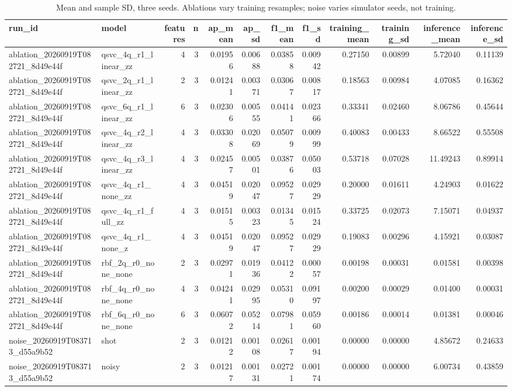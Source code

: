 \begin{table}
\caption{Mean and sample SD, three seeds. Ablations vary training resamples; noise varies simulator seeds, not training.}
\begin{tabular}{llrrrrrrrrrr}
\toprule
run\_id & model & features & n & ap\_mean & ap\_sd & f1\_mean & f1\_sd & training\_mean & training\_sd & inference\_mean & inference\_sd \\
\midrule
ablation\_20260919T082721\_8d49e44f & qsvc\_4q\_r1\_linear\_zz & 4 & 3 & 0.01956 & 0.00688 & 0.03858 & 0.00942 & 0.27150 & 0.00899 & 5.72040 & 0.11139 \\
ablation\_20260919T082721\_8d49e44f & qsvc\_2q\_r1\_linear\_zz & 2 & 3 & 0.01241 & 0.00371 & 0.03067 & 0.00817 & 0.18563 & 0.00984 & 4.07085 & 0.16362 \\
ablation\_20260919T082721\_8d49e44f & qsvc\_6q\_r1\_linear\_zz & 6 & 3 & 0.02306 & 0.00555 & 0.04141 & 0.02366 & 0.33341 & 0.02460 & 8.06786 & 0.45644 \\
ablation\_20260919T082721\_8d49e44f & qsvc\_4q\_r2\_linear\_zz & 4 & 3 & 0.03308 & 0.02069 & 0.05079 & 0.00999 & 0.40083 & 0.00433 & 8.66522 & 0.55508 \\
ablation\_20260919T082721\_8d49e44f & qsvc\_4q\_r3\_linear\_zz & 4 & 3 & 0.02457 & 0.00501 & 0.03876 & 0.05003 & 0.53718 & 0.07028 & 11.49243 & 0.89914 \\
ablation\_20260919T082721\_8d49e44f & qsvc\_4q\_r1\_none\_zz & 4 & 3 & 0.04519 & 0.02047 & 0.09527 & 0.02929 & 0.20000 & 0.01611 & 4.24903 & 0.01622 \\
ablation\_20260919T082721\_8d49e44f & qsvc\_4q\_r1\_full\_zz & 4 & 3 & 0.01515 & 0.00323 & 0.01345 & 0.01524 & 0.33725 & 0.02073 & 7.15071 & 0.04937 \\
ablation\_20260919T082721\_8d49e44f & qsvc\_4q\_r1\_none\_z & 4 & 3 & 0.04519 & 0.02047 & 0.09527 & 0.02929 & 0.19083 & 0.00296 & 4.15921 & 0.03087 \\
ablation\_20260919T082721\_8d49e44f & rbf\_2q\_r0\_none\_none & 2 & 3 & 0.02971 & 0.01936 & 0.04122 & 0.00057 & 0.00198 & 0.00031 & 0.01581 & 0.00398 \\
ablation\_20260919T082721\_8d49e44f & rbf\_4q\_r0\_none\_none & 4 & 3 & 0.04241 & 0.02995 & 0.05310 & 0.09197 & 0.00200 & 0.00029 & 0.01400 & 0.00031 \\
ablation\_20260919T082721\_8d49e44f & rbf\_6q\_r0\_none\_none & 6 & 3 & 0.06072 & 0.05214 & 0.07981 & 0.05960 & 0.00186 & 0.00014 & 0.01381 & 0.00046 \\
noise\_20260919T083713\_d55a9b52 & shot & 2 & 3 & 0.01212 & 0.00108 & 0.02617 & 0.00194 & 0.00000 & 0.00000 & 4.85672 & 0.24633 \\
noise\_20260919T083713\_d55a9b52 & noisy & 2 & 3 & 0.01217 & 0.00131 & 0.02721 & 0.00174 & 0.00000 & 0.00000 & 6.00734 & 0.43859 \\
\bottomrule
\end{tabular}
\end{table}
